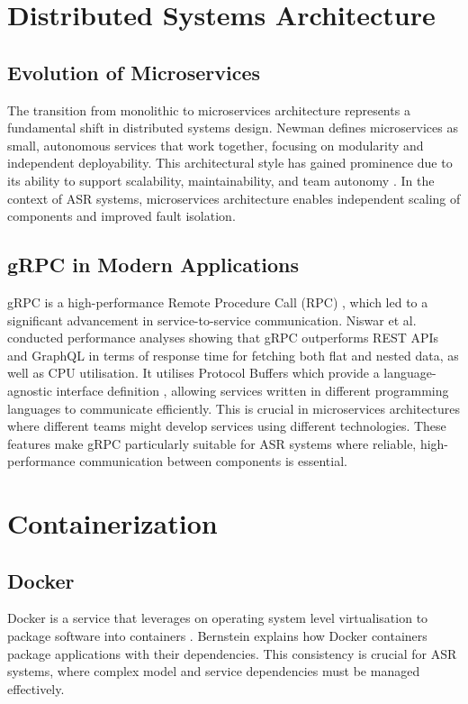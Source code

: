 \section{Distributed Systems Architecture}
\subsection{Evolution of Microservices}
The transition from monolithic to microservices architecture represents a fundamental shift in distributed systems design. Newman \cite{newman} defines microservices as small, autonomous services that work together, focusing on modularity and independent deployability. This architectural style has gained prominence due to its ability to support scalability, maintainability, and team autonomy \cite{microservices_benefits}. In the context of ASR systems, microservices architecture enables independent scaling of components and improved fault isolation.

\subsection{gRPC in Modern Applications}
gRPC is a high-performance Remote Procedure Call (RPC) \cite{grpc}, which led to a significant advancement in service-to-service communication. Niswar et al. \cite{grpc_comparison} conducted performance analyses showing that gRPC outperforms REST APIs and GraphQL in terms of response time for fetching both flat and nested data, as well as CPU utilisation. It utilises Protocol Buffers which provide a language-agnostic interface definition \cite{protocol_buffers}, allowing services written in different programming languages to communicate efficiently. This is crucial in microservices architectures where different teams might develop services using different technologies. These features make gRPC particularly suitable for ASR systems where reliable, high-performance communication between components is essential.

\section{Containerization}
\subsection{Docker}
Docker is a service that leverages on operating system level virtualisation to package software into containers \cite{docker_definition}. Bernstein \cite{Bernstein} explains how Docker containers package applications with their dependencies. This consistency is crucial for ASR systems, where complex model and service dependencies must be managed effectively.

